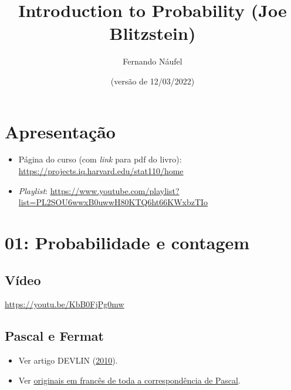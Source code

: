 \documentclass[
  11pt]{report}
\title{Introduction to Probability (Joe Blitzstein)}
\author{Fernando Náufel}
\date{(versão de 12/03/2022)}
\begin{document}
\maketitle

{
\setcounter{tocdepth}{1}
\tableofcontents
}
\hypertarget{apresentauxe7uxe3o}{%
\chapter*{Apresentação}\label{apresentauxe7uxe3o}}

\begin{itemize}
\item
  Página do curso (com \emph{link} para pdf do livro): \url{https://projects.iq.harvard.edu/stat110/home}
\item
  \emph{Playlist}: \url{https://www.youtube.com/playlist?list=PL2SOU6wwxB0uwwH80KTQ6ht66KWxbzTIo}
\end{itemize}

\hypertarget{probabilidade-e-contagem}{%
\chapter*{01: Probabilidade e contagem}\label{probabilidade-e-contagem}}

\hypertarget{vuxeddeo}{%
\section*{Vídeo}\label{vuxeddeo}}

\begin{center} \url{https://youtu.be/KbB0FjPg0mw} \end{center}

\hypertarget{pascal-e-fermat}{%
\section*{Pascal e Fermat}\label{pascal-e-fermat}}

\begin{itemize}
\item
  Ver artigo DEVLIN (\protect\hyperlink{ref-devlin-2010-pascal-fermat}{2010}).
\item
  Ver \href{https://gallica.bnf.fr/ark:/12148/bpt6k69975r.image.r=Blaise+Pascal.f233.langFR}{originais em francês de toda a correspondência de Pascal}.
\end{itemize}
\end{document}
